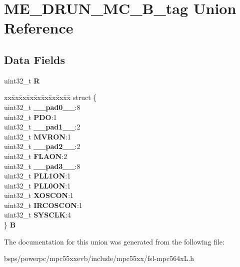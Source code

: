 \hypertarget{unionME__DRUN__MC__32B__tag}{}\section{M\+E\+\_\+\+D\+R\+U\+N\+\_\+\+M\+C\+\_\+B\+\_\+tag Union Reference}
\label{unionME__DRUN__MC__32B__tag}
\subsection*{Data Fields}
\begin{DoxyCompactItemize}
\item 
\mbox{\label{unionME__DRUN__MC__32B__tag_a7de193e19b5f6b0247d434afb706e1a7}} 
uint32\+\_\+t {\bfseries R}
\item 
\mbox{\label{unionME__DRUN__MC__32B__tag_a14495421d1991e6938e4cb892cb35ac6}} 
\begin{tabbing}
xx\=xx\=xx\=xx\=xx\=xx\=xx\=xx\=xx\=\kill
struct \{\\
\>uint32\_t {\bfseries \_\_pad0\_\_}:8\\
\>uint32\_t {\bfseries PDO}:1\\
\>uint32\_t {\bfseries \_\_pad1\_\_}:2\\
\>uint32\_t {\bfseries MVRON}:1\\
\>uint32\_t {\bfseries \_\_pad2\_\_}:2\\
\>uint32\_t {\bfseries FLAON}:2\\
\>uint32\_t {\bfseries \_\_pad3\_\_}:8\\
\>uint32\_t {\bfseries PLL1ON}:1\\
\>uint32\_t {\bfseries PLL0ON}:1\\
\>uint32\_t {\bfseries XOSCON}:1\\
\>uint32\_t {\bfseries IRCOSCON}:1\\
\>uint32\_t {\bfseries SYSCLK}:4\\
\} {\bfseries B}\\

\end{tabbing}\end{DoxyCompactItemize}


The documentation for this union was generated from the following file\+:\begin{DoxyCompactItemize}
\item 
bsps/powerpc/mpc55xxevb/include/mpc55xx/fsl-\/mpc564x\+L.\+h\end{DoxyCompactItemize}

